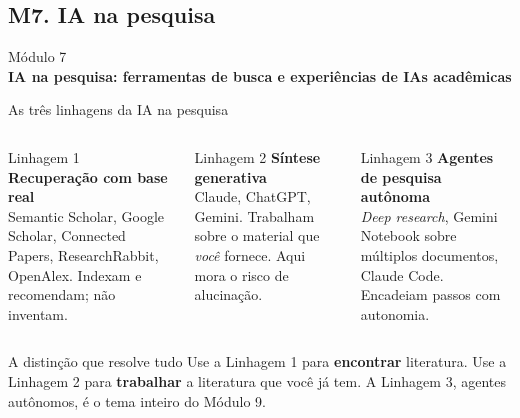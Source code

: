 \documentclass[11pt,aspectratio=169,t]{beamer}
\newcommand{\transicao}[2]{%
  \begin{frame}[plain]
    \centering
    \vspace*{2.2cm}
    {\large\color{cinzaescuro} #1}\\[0.8cm]
    {\Large\color{azulUNI}\textbf{#2}}
  \end{frame}}
\begin{document}
\subsection{M7. IA na pesquisa}
\transicao{Módulo 7}{IA na pesquisa: ferramentas de busca e experiências de IAs acadêmicas}

\begin{frame}{As três linhagens da IA na pesquisa}
  \small
  \begin{columns}[t]
    \begin{block}{\scriptsize Linhagem 1}
      \textbf{Recuperação com base real}\\[2pt]
      \scriptsize Semantic Scholar, Google Scholar, Connected Papers, ResearchRabbit, OpenAlex. Indexam e recomendam; não inventam.
    \end{block}
    \begin{block}{\scriptsize Linhagem 2}
      \textbf{Síntese generativa}\\[2pt]
      \scriptsize Claude, ChatGPT, Gemini. Trabalham sobre o material que \textit{você} fornece. Aqui mora o risco de alucinação.
    \end{block}
    \begin{block}{\scriptsize Linhagem 3}
      \textbf{Agentes de pesquisa autônoma}\\[2pt]
      \scriptsize \textit{Deep research}, Gemini Notebook sobre múltiplos documentos, Claude Code. Encadeiam passos com autonomia.
    \end{block}
  \end{columns}
  \pause
  \vfill
  \begin{alertblock}{A distinção que resolve tudo}
    Use a Linhagem 1 para \textbf{encontrar} literatura. Use a Linhagem 2 para \textbf{trabalhar} a literatura que você já tem. A Linhagem 3, agentes autônomos, é o tema inteiro do Módulo 9.
  \end{alertblock}
\end{frame}
\end{document}
